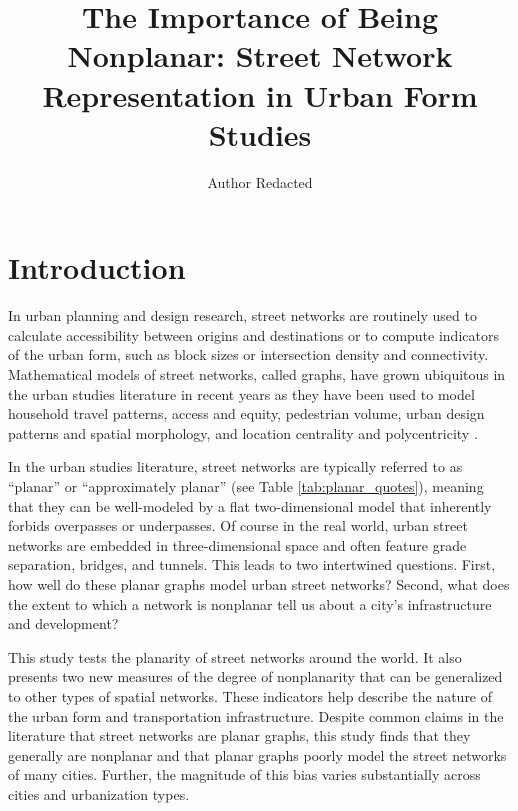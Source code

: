 \documentclass[Afour,sageh,times]{sagej}
\begin{document}
\title{The Importance of Being Nonplanar: Street Network Representation in Urban Form Studies}
\author{Author Redacted }


\begin{abstract}

\end{abstract}


\maketitle

\section{Introduction}

In urban planning and design research, street networks are routinely used to calculate accessibility between origins and destinations or to compute indicators of the urban form, such as block sizes or intersection density and connectivity. Mathematical models of street networks, called graphs, have grown ubiquitous in the urban studies literature in recent years as they have been used to model household travel patterns, access and equity, pedestrian volume, urban design patterns and spatial morphology, and location centrality and polycentricity \citep{marshall_street_2010,porta_alterations_2014,marshall_community_2014,hajrasouliha_impact_2015,parthasarathi_street_2015,knight_metrics_2015,gil_street_2016,zhong_revealing_2017}.

In the urban studies literature, street networks are typically referred to as \enquote{planar} or \enquote{approximately planar} (see Table \ref{tab:planar_quotes}), meaning that they can be well-modeled by a flat two-dimensional model that inherently forbids overpasses or underpasses. Of course in the real world, urban street networks are embedded in three-dimensional space and often feature grade separation, bridges, and tunnels. This leads to two intertwined questions. First, how well do these planar graphs model urban street networks? Second, what does the extent to which a network is nonplanar tell us about a city's infrastructure and development?

This study tests the planarity of street networks around the world. It also presents two new measures of the degree of nonplanarity that can be generalized to other types of spatial networks. These indicators help describe the nature of the urban form and transportation infrastructure. Despite common claims in the literature that street networks are planar graphs, this study finds that they generally are nonplanar and that planar graphs poorly model the street networks of many cities. Further, the magnitude of this bias varies substantially across cities and urbanization types.
\end{document}
